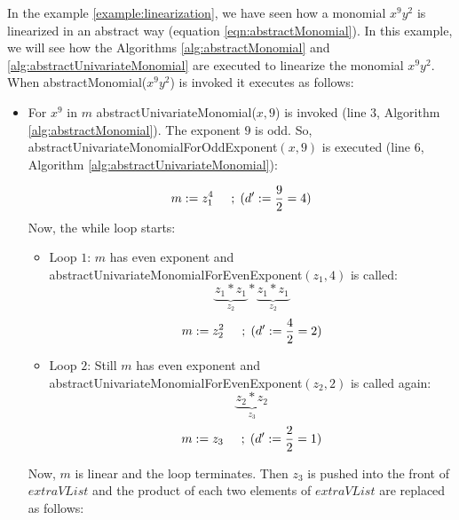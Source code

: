 \begin{sloppypar}
\begin{example}
\label{example:abstractUnivariateMonomial}
    In the example \ref{example:linearization}, we have seen how a monomial $x^9y^2$ is linearized in an abstract way (equation \ref{eqn:abstractMonomial}).
    In this example, we will see how the Algorithms \ref{alg:abstractMonomial} and \ref{alg:abstractUnivariateMonomial} are executed to linearize the monomial $x^9y^2$.
    When abstractMonomial($x^9y^2$) is invoked it executes as follows: 
    \begin{itemize}
        \item For $x^9$ in $m$ abstractUnivariateMonomial($x, 9$) is invoked (line $3$, Algorithm \ref{alg:abstractMonomial}).
        The exponent $9$ is odd.
        So, abstractUnivariateMonomialForOddExponent$(x, 9)$ is executed (line $6$, Algorithm \ref{alg:abstractUnivariateMonomial}):
        
\tikzset{every picture/.style=remember picture}
\begin{figure}[H]
\centering
{}
\end{figure}
        
        $$m := z_{1}^4 \hspace{5mm} ;\hspace{1mm}(d^\prime := \frac{9}{2} = 4)$$
        Now, the while loop starts:
        \begin{itemize}
            \item Loop $1$: $m$ has even exponent and abstractUnivariateMonomialForEvenExponent$(z_{1}, 4)$ is called:
            $$\underbrace{ z_{1} \ast z_{1} }\limits_{z_{2}} \ast \underbrace{ z_{1} \ast z_{1} }\limits_{z_{2}}$$
            $$m := z_{2}^2 \hspace{5mm} ;\hspace{1mm}(d^\prime := \frac{4}{2} = 2)$$
            \item Loop $2$: Still $m$ has even exponent and abstractUnivariateMonomialForEvenExponent$(z_{2}, 2)$ is called again:
            $$\underbrace{ z_{2} \ast z_{2} }\limits_{z_{3}}$$
            $$m := z_{3} \hspace{5mm} ;\hspace{1mm}(d^\prime := \frac{2}{2} = 1)$$
        \end{itemize}
        Now, $m$ is linear and the loop terminates.
        Then $z_{3}$ is pushed into the front of $extraVList$ and the product of each two elements of $extraVList$ are replaced as follows:
        

\end{itemize}
\end{example}
\end{sloppypar}
